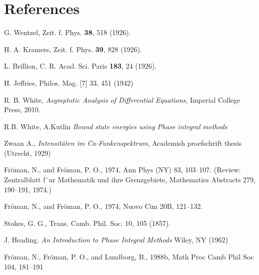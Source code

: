 \documentclass[12pt]{iopart}
\begin{document}
\section*{References}
\begin{thebibliography}{30}

 G. Wentzel, Zeit. f. Phys. \textbf{38}, 518 (1926).

 H. A. Kramers, Zeit. f. Phys. \textbf{39}, 828 (1926).

 L. Brillion, C. R. Acad. Sci. Paris \textbf{183}, 24 (1926).

 H. Jeffries, Philos. Mag. [7] 33, 451 (1942)

 R. B. White,
 {\it Asymptotic Analysis of Differential Equations}, Imperial College Press, 2010.

 R.B. White, A.Kutlin {\it Bound state energies using Phase integral methods} 

 Zwaan A., \textit{Intensit\"aten im Ca-Funkenspektrum}, Academish proefschrift thesis (Utrecht, 1929)

 Fr\"oman, N., and Fr\"oman, P. O., 1974, Ann Phys (NY) 83, 103–107. (Review: Zentralblatt
f¨ur Mathematik und ihre Grenzgebiete, Mathematics Abstracts 279, 190–191, 1974.)

 Fr\"oman, N., and Fr\"oman, P. O., 1974, Nuovo Cim 20B, 121–132.

 Stokes, G. G., Trans. Camb. Phil. Soc. 10, 105 (1857).

 J. Heading. {\it An Introduction to Phase Integral Methods} 
Wiley, NY (1962)

 Fr\"oman, N., Fr\"oman, P. O., and Lundborg, B., 1988b, Math Proc Camb Phil Soc 104, 181–191

\end{thebibliography}
\end{document}
